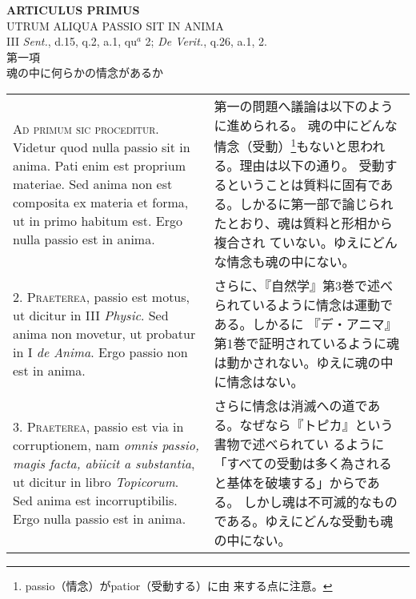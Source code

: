 \documentclass[10pt]{jsarticle} %
\begin{document}
\newpage
{}
\begin{center}
 {\Large {\bf ARTICULUS PRIMUS}}\\
 {\large UTRUM ALIQUA PASSIO SIT IN ANIMA}\\
 {\footnotesize III {\itshape Sent.}, d.15, q.2, a.1, qu${^a}$ 2; {\itshape
 De Verit.}, q.26, a.1, 2.}\\
 {\Large 第一項\\魂の中に何らかの情念があるか}
\end{center}

\begin{longtable}{p{21em}p{21em}}


{\scshape Ad primum sic proceditur}. Videtur quod nulla passio sit in
 anima. Pati enim est proprium materiae. Sed anima non est composita ex
 materia et forma, ut in primo habitum est. Ergo nulla passio est in
 anima.

&

第一の問題へ議論は以下のように進められる。
魂の中にどんな情念（受動）\footnote{passio（情念）がpatior（受動する）に由
 来する点に注意。}もないと思われる。理由は以下の通り。
受動するということは質料に固有である。しかるに第一部で論じられたとおり、魂は質料と形相から複合され
 ていない。ゆえにどんな情念も魂の中にない。

\\


2. {\scshape Praeterea}, passio est motus, ut dicitur in III {\itshape Physic}. Sed anima non
 movetur, ut probatur in I {\itshape de Anima}. Ergo passio non est in
 anima.

&

さらに、『自然学』第3巻で述べられているように情念は運動である。しかるに
 『デ・アニマ』第1巻で証明されているように魂は動かされない。ゆえに魂の中
 に情念はない。


\\



3. {\scshape Praeterea}, passio est via in corruptionem, nam {\itshape omnis passio, magis
 facta, abiicit a substantia}, ut dicitur in libro {\itshape Topicorum}. Sed anima
 est incorruptibilis. Ergo nulla passio est in anima.

&

さらに情念は消滅への道である。なぜなら『トピカ』という書物で述べられてい
 るように「すべての受動は多く為されると基体を破壊する」からである。
しかし魂は不可滅的なものである。ゆえにどんな受動も魂の中にない。


\\




\end{longtable}
\end{document}
